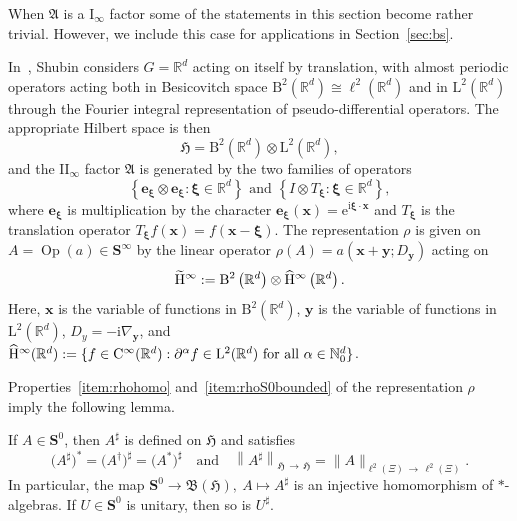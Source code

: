 \documentclass[AHL,Unicode,longabstracts,published]{cedram}
\DeclareMathOperator{\Op}{Op}
\newcommand{\RL}{\mathrm{L}}
\newcommand{\rmI}{\mathrm{I}}
\newcommand{\rmi}{\mathrm{i}}
\newcommand{\rme}{\mathrm{e}}
\newcommand{\rmII}{\mathrm{II}}
\renewcommand{\mathsf}{\mathrm}
\newcommand{\sfH}{\mathsf{H}}
\newcommand{\sfB}{\mathsf{B}}
\newcommand{\sfL}{\mathsf{L}}
\newcommand{\sfC}{\mathsf{C}}
\newcommand{\R}{\mathbb R}
\newcommand{\N}{\mathbb N}
\newcommand{\bxi}{\boldsymbol \xi}
\newcommand{\BS}{\mathbf S}
\newcommand{\bx}{\mathbf x}
\newcommand{\be}{\mathbf e}
\newcommand{\by}{\mathbf y}
\newcommand{\FA}{\mathfrak A}
\newcommand{\FB}{\mathfrak B}
\newcommand{\FH}{\mathfrak H}
\newcommand{\set}[1]{\left\{ #1 \right\}}
\let\oldhat\hat
\renewcommand*{\hat}[1]{\mathchoice{\widehat{#1}}{\widehat{#1}}{\oldhat{#1}}{\oldhat{#1}}}
\begin{document}
\begin{rema}
When $\FA$ is a $\rmI_\infty$ factor some of the statements in this section become rather trivial. However, we include this case for applications in Section~\ref{sec:bs}.
\end{rema}
\begin{rema}\label{rem:Shubin}
In~\cite{Shubin1979a}, Shubin considers $G = \R^d$ acting on itself by translation, with almost periodic operators acting both in Besicovitch space $\sfB^2(\R^d)\cong \ell^2(\R^d)$ and in $\sfL^2(\R^d)$ through the Fourier integral representation of pseudo-differential operators. The appropriate Hilbert space is then
\begin{equation}\label{eq:hilbert}
\FH = \sfB^2\left(\R^d\right) \otimes \sfL^2\left(\R^d\right),
\end{equation}
and the $\rmII_\infty$ factor $\FA$ is generated by the two families of operators
\begin{equation}
\set{\be_{\bxi} \otimes \be_{\bxi}: \bxi \in \R^d} \text{ and } \set{I \otimes T_{\bxi}: \bxi \in \R^d},\label{eq:iiinffact}
\end{equation}
where $\be_{\bxi}$ is multiplication by the character $\be_{\bxi}(\bx)=\rme^{\rmi\bxi\cdot \bx}$ and $T_{\bxi}$ is the translation operator $T_{\bxi} f(\bx) = f(\bx - \bxi) $. The representation $\rho$ is given on $A=\Op(a)\in \BS^\infty$ by the linear operator $\rho(A)=a(\bx+\by;D_\by)$ acting on
\begin{equation}
\widetilde{\sfH}^\infty:=\sfB^2\left(\R^d\right) \otimes \hat{\sfH}^\infty\left(\R^d\right).
\end{equation}
Here, $\bx$ is the variable of functions in $\sfB^2(\R^d)$, $\by$ is the variable of functions in $\RL^2(\R^d)$, $D_y=-\rmi\nabla_\by$, and $\hat{\sfH}^\infty(\R^d):= \{f\in \sfC^\infty(\R^d): \partial^\alpha f\in\sfL^2(\R^d)\text{ for all }\alpha\in\N_0^d\}$.
\end{rema} 
Properties~\eqref{item:rhohomo} and~\eqref{item:rhoS0bounded} of the representation $\rho$ imply the following lemma.
\begin{lemm}\label{lem:sharpS0}
If $A\in\BS^0$, then $A^\sharp$ is defined on $\FH$ and satisfies 
\[
\big(A^\sharp\big)^*=\big(A^\dagger\big)^\sharp = \big(A^*\big)^\sharp\quad\text{and}\quad\left\|A^\sharp\right\|_{\FH\,\to\,\FH}=\|A\|_{\ell^2(\Xi)\,\to\,\ell^2(\Xi)}.
\]
In particular, the map $\BS^0\to\FB(\FH),\ A\mapsto A^\sharp$ is an injective homomorphism of $*$-algebras. If $U\in\BS^0$ is unitary, then so is $U^\sharp$.
\end{lemm}
\end{document}
